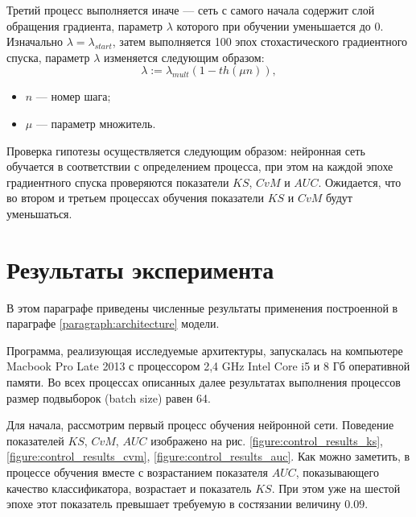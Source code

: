 \documentclass[14pt, a4paper]{extarticle}
\begin{document}
Третий процесс выполняется иначе — сеть с самого начала содержит слой обращения градиента, параметр $\lambda$ которого при обучении уменьшается до $0$. Изначально $\lambda=\lambda_{start}$, затем выполняется 100 эпох стохастического градиентного спуска, параметр $\lambda$ изменяется следующим образом: 
\begin{equation*}
	\lambda := \lambda_{mult}(1 - th(\mu n)),
\end{equation*}
\begin{itemize}
	\item $n$ — номер шага;
	\item $\mu$ — параметр множитель.
\end{itemize}

Проверка гипотезы осуществляется следующим образом: нейронная сеть обучается в соответствии с определением процесса, при этом на каждой эпохе градиентного спуска проверяются показатели $KS$, $CvM$ и $AUC$. Ожидается, что во втором и третьем процессах обучения показатели $KS$ и $CvM$ будут уменьшаться.


\section{Результаты эксперимента}
\label{paragraph:results}

В этом параграфе приведены численные результаты применения построенной в параграфе \ref{paragraph:architecture} модели.

Программа, реализующая исследуемые архитектуры, запускалась на компьютере Macbook Pro Late 2013 с процессором 2,4 GHz Intel Core i5 и 8 Гб оперативной памяти. Во всех процессах описанных далее результатах выполнения процессов размер подвыборок (batch size) равен 64.

Для начала, рассмотрим первый процесс обучения нейронной сети. Поведение показателей $KS$, $CvM$, $AUC$ изображено на рис. \ref{figure:control_results_ks}, \ref{figure:control_results_cvm}, \ref{figure:control_results_auc}. Как можно заметить, в процессе обучения вместе с возрастанием показателя $AUC$, показывающего качество классификатора, возрастает и показатель $KS$. При этом уже на шестой эпохе этот показатель превышает требуемую в состязании величину $0.09$. 
\end{document}
